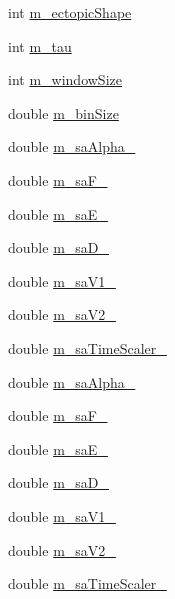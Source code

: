 \begin{DoxyCompactItemize}
int \hyperlink{classatrial_parameters_afe91e813e74a3ce65ae96d67d2f494fa}{m\+\_\+ectopic\+Shape}
\item 
int \hyperlink{classatrial_parameters_a8c91fc5cd8f650af08490b48e709eef3}{m\+\_\+tau}
\item 
int \hyperlink{classatrial_parameters_a51edde97bace13d58f81f63088d34091}{m\+\_\+window\+Size}
\item 
double \hyperlink{classatrial_parameters_a0d716adf42c0d2bb5a1710dab87945dd}{m\+\_\+bin\+Size}
\item 
double \hyperlink{classatrial_parameters_a85b3229f7f7c2647959f9279b529c1f1}{m\+\_\+sa\+Alpha\+\_}
\item 
double \hyperlink{classatrial_parameters_a1e8e23a505155653c60fdb1cf0d61ee4}{m\+\_\+sa\+F\+\_}
\item 
double \hyperlink{classatrial_parameters_a9b64484f925b284f6451ad111c785d0a}{m\+\_\+sa\+E\+\_}
\item 
double \hyperlink{classatrial_parameters_a2d59c4e50862bdebe7ebc5eacd1e6f9f}{m\+\_\+sa\+D\+\_}
\item 
double \hyperlink{classatrial_parameters_a545b07010132882595bd381bcdeb54fa}{m\+\_\+sa\+V1\+\_}
\item 
double \hyperlink{classatrial_parameters_a7da38842e625577befe40b6c8bc10799}{m\+\_\+sa\+V2\+\_}
\item 
double \hyperlink{classatrial_parameters_a27d8b73846168cf5c1c1a78c9af9e06d}{m\+\_\+sa\+Time\+Scaler\+\_}
\item 
double \hyperlink{classatrial_parameters_a598124cb1bc794498c6a6fc960208f94}{m\+\_\+sa\+Alpha\+\_}
\item 
double \hyperlink{classatrial_parameters_a54d265d9e0ee531c7131435e3fef051a}{m\+\_\+sa\+F\+\_}
\item 
double \hyperlink{classatrial_parameters_a4accc78aca74335f322395a947f93ad5}{m\+\_\+sa\+E\+\_}
\item 
double \hyperlink{classatrial_parameters_ac41740519e443f06ddbc11595f8209ef}{m\+\_\+sa\+D\+\_}
\item 
double \hyperlink{classatrial_parameters_a5f0a151a1ee2fd1c3497c76755bda790}{m\+\_\+sa\+V1\+\_}
\item 
double \hyperlink{classatrial_parameters_a3e9c12e5a98eedc7d7b1dc858ed4c4fb}{m\+\_\+sa\+V2\+\_}
\item 
double \hyperlink{classatrial_parameters_a1a9186146d8506816d1aa26aaab59632}{m\+\_\+sa\+Time\+Scaler\+\_}
\item 

\end{DoxyCompactItemize}
